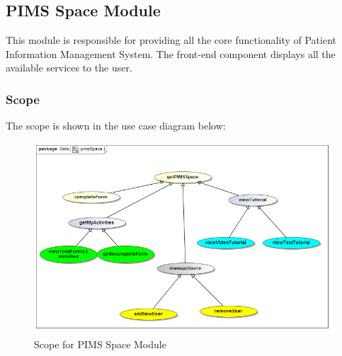 \subsection{PIMS Space Module}
This module is responsible for providing all the core functionality of Patient Information Management System. The front-end component displays all the available services to the user. \par 

\subsubsection{Scope}
The scope is shown in the use case diagram below: \par
		\begin{figure}[H]
			\centerline{\includegraphics[width=0.75\linewidth]{./Functional_Requirements/Graphics/pimsSpace/pimsSpace}}
			\caption{Scope for PIMS Space Module}
		\end{figure}

